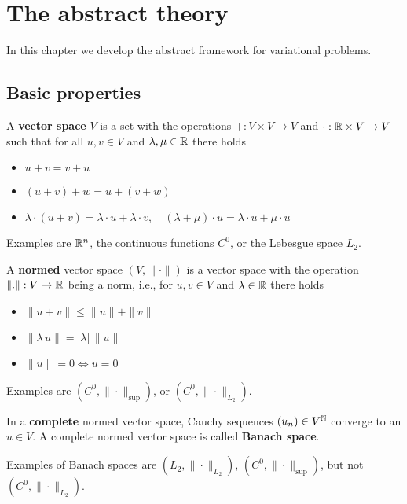 \chapter{The abstract theory}

In this chapter we develop the abstract framework for variational problems.

\section{Basic properties}

\begin{definition}A {\bf vector space} $V$ is a set with
the operations $+ : V \times V \rightarrow V$ and $\cdot : {\mathbb R} \times V
\rightarrow V$ such that for all $u,v \in V$ and $\lambda, \mu \in {\mathbb R}$
there holds
\begin{itemize}
\item $u + v = v + u$
\item $(u+v)+w = u + (v+w)$
\item $\lambda \cdot (u+v) = 
\lambda \cdot u + \lambda \cdot v, \quad 
(\lambda + \mu) \cdot u = \lambda \cdot u + \mu \cdot u$
\end{itemize}
\end{definition}
\noindent
Examples are ${\mathbb R}^n$, the continuous functions $C^0$, or the Lebesgue space $L_2$.

\begin{definition} A {\bf normed} vector space $(V,\|\cdot\|)$ is a vector 
space with the operation $\| . \| : V \rightarrow {\mathbb R}$ being a norm, i.e.,
for $u,v \in V$ and $\lambda \in {\mathbb R}$ there holds
\begin{itemize}
\item
$\| u + v \| \leq \| u \| + \| v \|$
\item
$\| \lambda \, u \| = | \lambda | \, \| u \|$
\item
$\| u \| = 0 \Leftrightarrow u = 0$
\end{itemize}
\end{definition}
\noindent
Examples are $(C^0, \|\cdot\|_{\sup})$, or $(C^0, \|\cdot\|_{L_2})$.

\begin{definition} In a {\bf complete} normed vector space, Cauchy sequences 
$(u_n) \in V^{\mathbb N}$ converge to an $u \in V$. A complete normed vector space
is called {\bf Banach space}.
\end{definition}
\noindent
Examples of Banach spaces are $(L_2, \|\cdot\|_{L_2})$, 
$(C^0, \|\cdot\|_{\sup})$, but not $(C^0, \|\cdot\|_{L_2})$.


